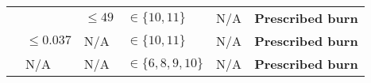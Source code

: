 \begin{longtable}{p{.1\linewidth}p{.1\linewidth}p{.15\linewidth}p{.15\linewidth}p{.2\linewidth}p{.25\linewidth}}
                                  & \multicolumn{1}{c}{}                                   & $ \le 49$                                        & $\in \{10,11\}$               & N/A                                                                                                     & \textbf{Prescribed burn}                                                          \\ \cline{2-6} 
                                  & $\le 0.037$                                        & N/A                                                 & $\in \{10,11\}$               & N/A                                                                                                     & \textbf{Prescribed burn}                                                          \\ \cline{2-6} 
                                  & N/A                                                    & N/A                                                 & $\in \{6,8,9,10\}$            & N/A                                                                                                     & \textbf{Prescribed burn}\footnotemark[\ref{footnote:p2TrtNote}] \\
\end{longtable}
